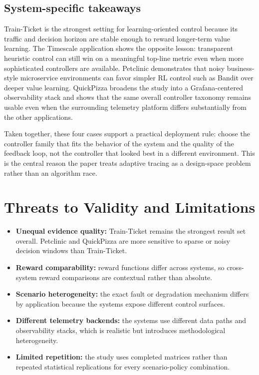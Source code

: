 \documentclass[10pt,twocolumn]{article}
\begin{document}
\subsection{System-specific takeaways}
Train-Ticket is the strongest setting for learning-oriented control because its traffic and decision horizon are stable enough to reward longer-term value learning. The Timescale application shows the opposite lesson: transparent heuristic control can still win on a meaningful top-line metric even when more sophisticated controllers are available. Petclinic demonstrates that noisy business-style microservice environments can favor simpler RL control such as Bandit over deeper value learning. QuickPizza broadens the study into a Grafana-centered observability stack and shows that the same overall controller taxonomy remains usable even when the surrounding telemetry platform differs substantially from the other applications.

Taken together, these four cases support a practical deployment rule: choose the controller family that fits the behavior of the system and the quality of the feedback loop, not the controller that looked best in a different environment. This is the central reason the paper treats adaptive tracing as a design-space problem rather than an algorithm race.

\section{Threats to Validity and Limitations}
\begin{itemize}
  \item \textbf{Unequal evidence quality:} Train-Ticket remains the strongest result set overall. Petclinic and QuickPizza are more sensitive to sparse or noisy decision windows than Train-Ticket.
  \item \textbf{Reward comparability:} reward functions differ across systems, so cross-system reward comparisons are contextual rather than absolute.
  \item \textbf{Scenario heterogeneity:} the exact fault or degradation mechanism differs by application because the systems expose different control surfaces.
  \item \textbf{Different telemetry backends:} the systems use different data paths and observability stacks, which is realistic but introduces methodological heterogeneity.
  \item \textbf{Limited repetition:} the study uses completed matrices rather than repeated statistical replications for every scenario-policy combination.
\end{itemize}
\end{document}
